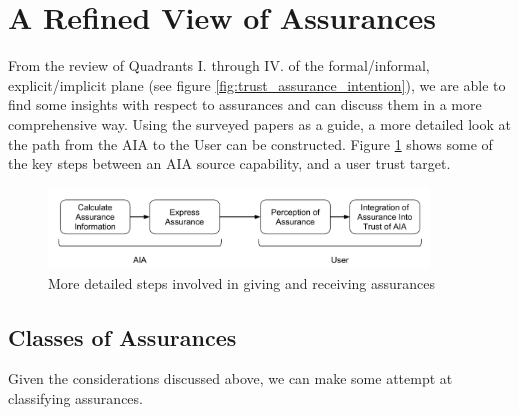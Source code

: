\section{A Refined View of Assurances} \label{sec:synthesis}
    From the review of Quadrants I. through IV. of the formal/informal, explicit/implicit plane (see figure \ref{fig:trust_assurance_intention}), we are able to find some insights with respect to assurances and can discuss them in a more comprehensive way. Using the surveyed papers as a guide, a more detailed look at the path from the AIA to the User can be constructed. Figure \ref{fig:assurance_path} shows some of the key steps between an AIA source capability, and a user trust target.

    \begin{figure}[htbp]
        \centering
        \includegraphics[width=0.9\textwidth]{Figures/Assurance_Path.pdf}
        \caption{More detailed steps involved in giving and receiving assurances}
        \label{fig:assurance_path}
    \end{figure}

    
    

\subsection{Classes of Assurances}
    Given the considerations discussed above, we can make some attempt at classifying assurances.
    
    
    
    
